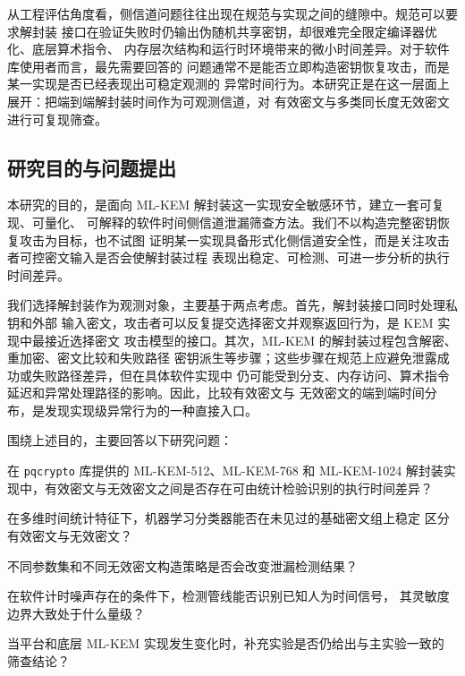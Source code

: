 \documentclass[a4paper,fontset=none]{ctexart}
\begin{document}
从工程评估角度看，侧信道问题往往出现在规范与实现之间的缝隙中。规范可以要求解封装
接口在验证失败时仍输出伪随机共享密钥，却很难完全限定编译器优化、底层算术指令、
内存层次结构和运行时环境带来的微小时间差异。对于软件库使用者而言，最先需要回答的
问题通常不是能否立即构造密钥恢复攻击，而是某一实现是否已经表现出可稳定观测的
异常时间行为。本研究正是在这一层面上展开：把端到端解封装时间作为可观测信道，对
有效密文与多类同长度无效密文进行可复现筛查。

\subsection{研究目的与问题提出}
\label{sec:purpose}

本研究的目的，是面向 ML-KEM 解封装这一实现安全敏感环节，建立一套可复现、可量化、
可解释的软件时间侧信道泄漏筛查方法。我们不以构造完整密钥恢复攻击为目标，也不试图
证明某一实现具备形式化侧信道安全性，而是关注攻击者可控密文输入是否会使解封装过程
表现出稳定、可检测、可进一步分析的执行时间差异。

我们选择解封装作为观测对象，主要基于两点考虑。首先，解封装接口同时处理私钥和外部
输入密文，攻击者可以反复提交选择密文并观察返回行为，是 KEM 实现中最接近选择密文
攻击模型的接口。其次，ML-KEM 的解封装过程包含解密、重加密、密文比较和失败路径
密钥派生等步骤；这些步骤在规范上应避免泄露成功或失败路径差异，但在具体软件实现中
仍可能受到分支、内存访问、算术指令延迟和异常处理路径的影响。因此，比较有效密文与
无效密文的端到端时间分布，是发现实现级异常行为的一种直接入口。

围绕上述目的，主要回答以下研究问题：

\begin{description}[leftmargin=3.5em,labelsep=0.6em]
  \item[RQ1] 在 \texttt{pqcrypto} 库提供的 ML-KEM-512、ML-KEM-768 和 ML-KEM-1024
        解封装实现中，有效密文与无效密文之间是否存在可由统计检验识别的执行时间差异？
  \item[RQ2] 在多维时间统计特征下，机器学习分类器能否在未见过的基础密文组上稳定
        区分有效密文与无效密文？
  \item[RQ3] 不同参数集和不同无效密文构造策略是否会改变泄漏检测结果？
  \item[RQ4] 在软件计时噪声存在的条件下，检测管线能否识别已知人为时间信号，
        其灵敏度边界大致处于什么量级？
  \item[RQ5] 当平台和底层 ML-KEM 实现发生变化时，补充实验是否仍给出与主实验一致的
        筛查结论？
\end{description}
\end{document}
